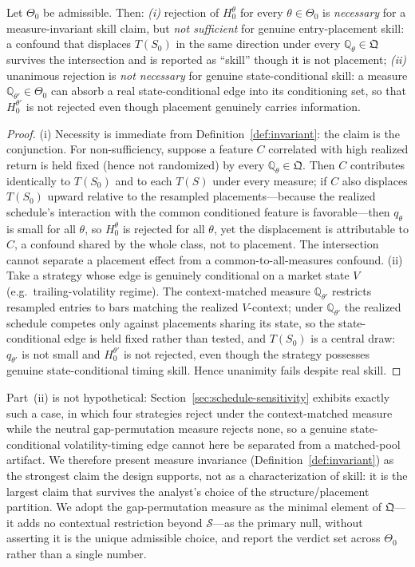 \begin{proposition}
\label{prop:logic}
Let $\Theta_0$ be admissible. Then:
\emph{(i)} rejection of $H_0^\theta$ for every $\theta\in\Theta_0$ is
\emph{necessary} for a measure-invariant skill claim, but \emph{not sufficient}
for genuine entry-placement skill: a confound that displaces $T(S_0)$ in the same
direction under every $\mathbb{Q}_\theta\in\mathfrak Q$ survives the intersection
and is reported as ``skill'' though it is not placement;
\emph{(ii)} unanimous rejection is \emph{not necessary} for genuine
state-conditional skill: a measure $\mathbb{Q}_{\theta'}\in\Theta_0$ can absorb a
real state-conditional edge into its conditioning set, so that
$H_0^{\theta'}$ is not rejected even though placement genuinely carries
information.
\end{proposition}

\begin{proof}
(i) Necessity is immediate from Definition~\ref{def:invariant}: the claim is the
conjunction. For non-sufficiency, suppose a feature $C$ correlated with high
realized return is held fixed (hence not randomized) by every
$\mathbb{Q}_\theta\in\mathfrak Q$. Then $C$ contributes identically to $T(S_0)$ and
to each $T(S)$ under every measure; if $C$ also displaces $T(S_0)$ upward relative
to the resampled placements---because the realized schedule's interaction with the
common conditioned feature is favorable---then $q_\theta$ is small for all
$\theta$, so $H_0^\theta$ is rejected for all $\theta$, yet the displacement is
attributable to $C$, a confound shared by the whole class, not to placement. The
intersection cannot separate a placement effect from a common-to-all-measures
confound. (ii) Take a strategy whose edge is genuinely conditional on a market
state $V$ (e.g.\ trailing-volatility regime). The context-matched measure
$\mathbb{Q}_{\theta'}$ restricts resampled entries to bars matching the realized
$V$-context; under $\mathbb{Q}_{\theta'}$ the realized schedule competes only
against placements sharing its state, so the state-conditional edge is held fixed
rather than tested, and $T(S_0)$ is a central draw: $q_{\theta'}$ is not small and
$H_0^{\theta'}$ is not rejected, even though the strategy possesses genuine
state-conditional timing skill. Hence unanimity fails despite real skill.
\end{proof}

Part~(ii) is not hypothetical: Section~\ref{sec:schedule-sensitivity} exhibits
exactly such a case, in which four strategies reject under the context-matched
measure while the neutral gap-permutation measure rejects none, so a genuine
state-conditional volatility-timing edge cannot here be separated from a matched-pool
artifact. We therefore present measure invariance (Definition~\ref{def:invariant})
as the strongest claim the design supports, not as a characterization of skill:
it is the largest claim that survives the analyst's choice of the
structure/placement partition. We adopt the gap-permutation measure as the
minimal element of $\mathfrak Q$---it adds no contextual restriction beyond
$\mathcal S$---as the primary null, without asserting it is the unique admissible
choice, and report the verdict set across $\Theta_0$ rather than a single number.

